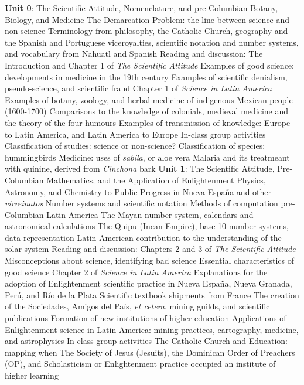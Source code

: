 \documentclass[10pt]{article}
\begin{document}
\begin{outline}[enumerate]
\1 \textbf{Unit 0}: The Scientific Attitude, Nomenclature, and pre-Columbian Botany, Biology, and Medicine
\2 The Demarcation Problem: the line between science and non-science
\2 Terminology from philosophy, the Catholic Church, geography and the Spanish and Portuguese viceroyalties, scientific notation and number systems, and vocabulary from Nahuatl and Spanish
\2 Reading and discussion:
\3 The Introduction and Chapter 1 of \textit{The Scientific Attitude}
\4 Examples of good science: developments in medicine in the 19th century
\4 Examples of scientific denialism, pseudo-science, and scientific fraud
\3 Chapter 1 of \textit{Science in Latin America}
\4 Examples of botany, zoology, and herbal medicine of indigenous Mexican people (1600-1700)
\4 Comparisons to the knowledge of colonials, medieval medicine and the theory of the four humours
\4 Examples of transmission of knowledge: Europe to Latin America, and Latin America to Europe
\2 In-class group activities
\3 Classification of studies: science or non-science?
\3 Classification of species: hummingbirds
\3 Medicine: uses of \textit{sabila}, or aloe vera
\3 Malaria and its treatmeant with quinine, derived from \textit{Cinchona} bark
\1 \textbf{Unit 1}: The Scientific Attitude, Pre-Columbian Mathematics, and the Application of Enlightenment Physics, Astronomy, and Chemistry to Public Progress in Nueva Espa\~{n}a and other \textit{virreinatos}
\2 Number systems and scientific notation
\2 Methods of computation pre-Columbian Latin America
\3 The Mayan number system, calendars and astronomical calculations
\3 The Quipu (Incan Empire), base 10 number systems, data representation
\3 Latin American contribution to the understanding of the solar system
\2 Reading and discussion:
\3 Chapters 2 and 3 of \textit{The Scientific Attitude}
\4 Misconceptions about science, identifying bad science
\4 Essential characteristics of good science
\3 Chapter 2 of \textit{Science in Latin America}
\4 Explanations for the adoption of Enlightenment scientific practice in Nueva Espa\~{n}a, Nueva Granada, Per\'{u}, and R\'{i}o de la Plata
\4 Scientific textbook shipments from France
\4 The creation of the Sociedades, Amigos del Pa\'{i}s, \textit{et cetera}, mining guilds, and scientific publications
\4 Formation of new institutions of higher education
\4 Applications of Enlightenment science in Latin America: mining practices, cartography, medicine, and astrophysics
\2 In-class group activities
\3 The Catholic Church and Education: mapping when The Society of Jesus (Jesuits), the Dominican Order of Preachers (OP), and Scholasticism or Enlightenment practice occupied an institute of higher learning

\end{outline}
\end{document}
